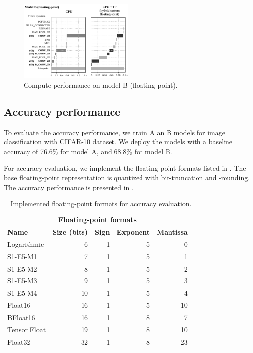 \begin{figure}[t!]
	\centering
	\includegraphics[width=0.5\textwidth]{../figures/sched_B_float.pdf}
	\caption{Compute performance on model B (floating-point).}
	\label{fig:sched_model_b_float}
\end{figure}

\subsection{Accuracy performance}

To evaluate the accuracy performance, we train A an B models for image classification with CIFAR-10 dataset. We deploy the models with a baseline accuracy of 76.6\% for model A, and 68.8\% for model B.

For accuracy evaluation, we implement the floating-point formats listed in . The base floating-point representation is quantized with bit-truncation and -rounding. The accuracy performance is presented in .

\begin{table}[!htp]\centering
	\caption{Implemented floating-point formats for accuracy evaluation.}\label{tab:formats}
	\scriptsize
	\begin{tabular}{lrrrrr}\toprule
		\multicolumn{5}{c}{\textbf{Floating-point formats}} \\\cmidrule{1-5}
		\textbf{Name} &\textbf{Size (bits)} &\textbf{Sign} &\textbf{Exponent} &\textbf{Mantissa} \\\midrule
		Logarithmic &6 &1 &5 &0 \\
		S1-E5-M1 &7 &1 &5 &1 \\
		S1-E5-M2 &8 &1 &5 &2 \\
		S1-E5-M3 &9 &1 &5 &3 \\
		S1-E5-M4 &10 &1 &5 &4 \\
		Float16 &16 &1 &5 &10 \\
		BFloat16 &16 &1 &8 &7 \\
		Tensor Float &19 &1 &8 &10 \\
		Float32 &32 &1 &8 &23 \\
		\bottomrule
	\end{tabular}
\end{table}

